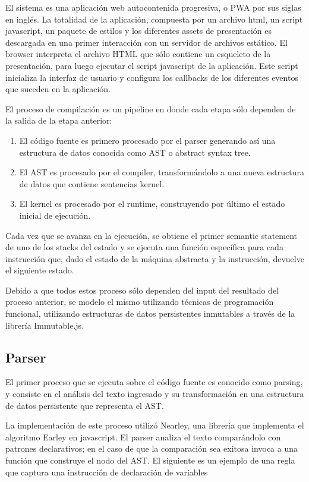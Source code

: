 \documentclass[a4paper,11pt]{article}
\begin{document}
El sistema es una aplicación web autocontenida progresiva, o PWA por sus siglas en inglés. La totalidad de la aplicación, compuesta por un archivo html, un script javascript, un paquete de estilos y los diferentes assets de presentación es descargada en una primer interacción con un servidor de archivos estático. El browser interpreta el archivo HTML que sólo contiene un esqueleto de la presentación, para luego ejecutar el script javascript de la aplicación. Este script inicializa la interfaz de usuario y configura los callbacks de los diferentes eventos que suceden en la aplicación.

El proceso de compilación es un pipeline en donde cada etapa sólo dependen de la salida de la etapa anterior: 

\begin{enumerate}
    \item El código fuente es primero procesado por el parser generando así una estructura de datos conocida como AST\cite{ast} o abstract syntax tree.
    \item El AST es procesado por el compiler, transformándolo a una nueva estructura de datos que contiene sentencias kernel.
    \item El kernel es procesado por el runtime, construyendo por último el estado inicial de ejecución.
\end{enumerate}

Cada vez que se avanza en la ejecución, se obtiene el primer semantic statement de uno de los stacks del estado y se ejecuta una función específica para cada instrucción que, dado el estado de la máquina abstracta y la instrucción, devuelve el siguiente estado.

Debido a que todos estos proceso sólo dependen del input del resultado del proceso anterior, se modelo el mismo utilizando técnicas de programación funcional, utilizando estructuras de datos persistentes inmutables a través de la librería Immutable.js\cite{immutable}.

\subsection{Parser}

El primer proceso que se ejecuta sobre el código fuente es conocido como parsing\cite{parsing}, y consiste en el análisis del texto ingresado y su transformación en una estructura de datos persistente que representa el AST.

La implementación de este proceso utilizó Nearley\cite{nearley}, una librería que implementa el algoritmo Earley\cite{earley} en javascript. El parser analiza el texto comparándolo con patrones declarativos; en el caso de que la comparación sea exitosa invoca a una función que construye el nodo del AST. El siguiente es un ejemplo de una regla que captura una instrucción de declaración de variables
\end{document}
